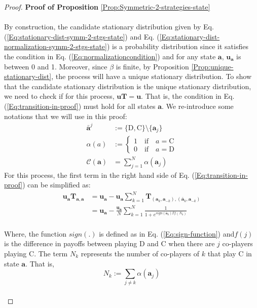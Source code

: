 \documentclass[11pt]{article}
\theoremstyle{plainCl1}
\theoremstyle{plainCl2}
\newcommand{\abf}{\mathbf{a}}
\newcommand{\T}{\mathbf{T}}
\newcommand{\ubf}{\mathbf{u}}
\newcommand{\C}{\mathrm{C}}
\newcommand{\D}{\mathrm{D}}
\begin{document}
\begin{proof}
\textbf{Proof of Proposition} \ref{Prop:Symmetric-2-strategies-state} \\ \\
By construction, the candidate stationary distribution given by Eq. (\ref{Eq:stationary-dist-symm-2-stgs-state}) and Eq. (\ref{Eq:stationary-dist-normalization-symm-2-stgs-state}) is a probability distribution since it satisfies the condition in Eq. (\ref{Eq:normalizationcondition}) and for any state $\abf$, $\ubf_{\abf}$ is between 0 and 1.  Moreover, since $\beta$ is finite, by Proposition \ref{Prop:unique-stationary-dist}, the process will have a unique stationary distribution. To show that the candidate stationary distribution is the unique stationary distribution, we need to check if for this process, $\ubf \T= \ubf$. That is, the condition in Eq. (\ref{Eq:transition-in-proof}) must hold for all states $\abf$. We re-introduce some notations that we will use in this proof: 
\begin{align}
\bar{\abf}^j &:= \{\D,\C\} \setminus \{\abf_j\} \\[10pt]
\alpha(a)&:= 
\begin{cases}
1 \quad \text{if} \quad a = \C \\[10pt]
0 \quad \text{if} \quad a = \D 
\end{cases}\\[10pt]
\mathcal{C}(\abf) &= \sum_{j=1}^N \alpha(\abf_j)
\end{align}
For this process, the first term in the right hand side of Eq. (\ref{Eq:transition-in-proof}) can be simplified as: 
\begin{align}
\ubf_{\abf} \T_{\abf,\abf}  &= \ubf_\abf - \ubf_{\abf} \sum_{k=1}^{N} \T_{(\abf_k, \abf_{-k}),(\bar{\abf}_{k}, \abf_{-k})} \\[10pt]
&= \ubf_{\abf} - \frac{\ubf_{\abf}}{N} \sum_{k=1}^N \frac{1}{1 + \displaystyle e^{\mathit{sign}(\bar{\abf}_{k}) \beta f(N_k)}}
\label{Eq:T_aa_u_a term}
\end{align}
\\ \noindent Where, the function $\mathit{sign}(.)$ is  defined as in Eq. (\ref{Eq:sign-function}) and$f(j)$ is the difference in payoffs between playing $\D$ and $\C$ when there are $j$ co-players playing $\C$. The term $N_k$ represents the number of co-players of $k$ that play $\C$ in state $\abf$. That is,
\begin{equation}
N_k := \sum_{j \neq k} \alpha(\abf_j)
\end{equation} \\

\end{proof}
\end{document}
